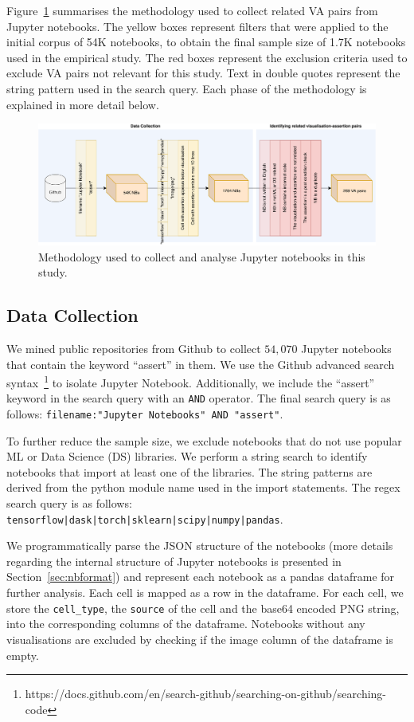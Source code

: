 \documentclass[conference]{IEEEtran}
\begin{document}
Figure~\ref{fig:method} summarises the methodology used to collect related VA pairs from Jupyter notebooks. The yellow boxes represent filters that were applied to the initial corpus of 54K notebooks, to obtain the final sample size of 1.7K notebooks used in the empirical study. The red boxes represent the exclusion criteria used to exclude VA pairs not relevant for this study. Text in double quotes represent the string pattern used in the search query. Each phase of the methodology is explained in more detail below.

\begin{figure}
  \centering
  \includegraphics[width=\textwidth]{method.pdf}
  \caption{Methodology used to collect and analyse Jupyter notebooks
    in this study.}
  \label{fig:method}
\end{figure}

\subsection{Data Collection}\label{sec:data-collect}

We mined public repositories from Github to collect $54,070$ Jupyter notebooks that contain the keyword ``assert'' in them. We use the Github advanced search syntax~\footnote{https://docs.github.com/en/search-github/searching-on-github/searching-code} to isolate Jupyter Notebook. Additionally, we include the ``assert'' keyword in the search query with an \texttt{AND} operator. The final search query is as follows: \texttt{filename:"Jupyter Notebooks" AND "assert"}.

To further reduce the sample size, we exclude notebooks that do not use popular ML or Data Science (DS) libraries. We perform a string search to identify notebooks that import at least one of the libraries. The string patterns are derived from the python module name used in the import statements. The regex search query is as follows: \texttt{tensorflow|dask|torch|sklearn|scipy|numpy|pandas}.

We programmatically parse the JSON structure of the notebooks (more details regarding the internal structure of Jupyter notebooks is presented in Section~\ref{sec:nbformat}) and represent each notebook as a pandas dataframe for further analysis. Each cell is mapped as a row in the dataframe. For each cell, we store the \texttt{cell\_type}, the \texttt{source} of the cell and the base64 encoded PNG string, into the corresponding columns of the dataframe. Notebooks without any visualisations are excluded by checking if the image column of  the dataframe is empty.
\end{document}
